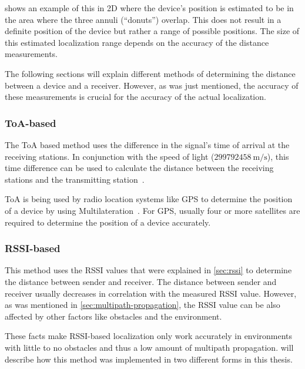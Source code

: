  shows an example of this in 2D where the device's position is estimated to be in the area where the three annuli (``donuts'') overlap.
This does not result in a definite position of the device but rather a range of possible positions.
The size of this estimated localization range depends on the accuracy of the distance measurements.

The following sections will explain different methods of determining the distance between a device and a receiver.
However, as was just mentioned, the accuracy of these measurements is crucial for the accuracy of the actual localization.

\subsubsection{\acs{ToA}-based}\label{sec:toa-based-multilateration}

The \acf{ToA} based method uses the difference in the signal's time of arrival at the receiving stations.
In conjunction with the speed of light ($299792458\ \mathrm{m/s}$), this time difference can be used to calculate the distance between the receiving stations and the transmitting station~\cite{khalaf-allah_time_2015}.

\ac{ToA} is being used by radio location systems like \ac{GPS} to determine the position of a device by using Multilateration~\cite{department_of_defense_usa_gps_2020}.
For GPS, usually four or more satellites are required to determine the position of a device accurately.

\subsubsection{\acs{RSSI}-based}\label{sec:rssi-based-multilateration}

This method uses the \acf{RSSI} values that were explained in \cref{sec:rssi} to determine the distance between sender and receiver.
The distance between sender and receiver usually decreases in correlation with the measured \ac{RSSI} value.
However, as was mentioned in \cref{sec:multipath-propagation}, the \ac{RSSI} value can be also affected by other factors like obstacles and the environment.

These facts make \ac{RSSI}-based localization only work accurately in environments with little to no obstacles and thus a low amount of multipath propagation.
 will describe how this method was implemented in two different forms in this thesis.


